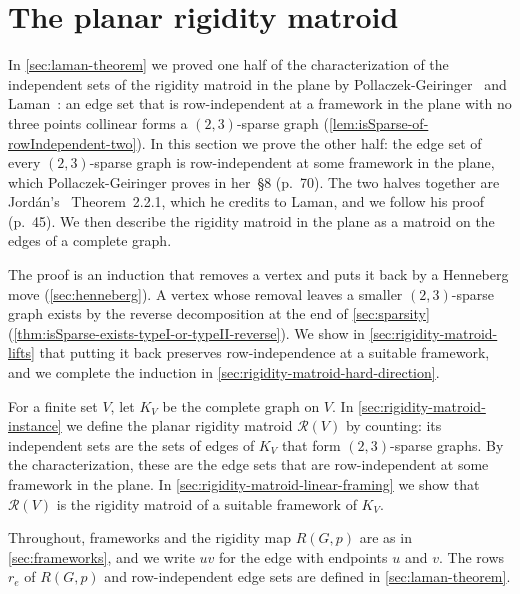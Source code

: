 \section{The planar rigidity matroid}
\label{sec:rigidity-matroid}

In \cref{sec:laman-theorem} we proved one half of the characterization
of the independent sets of the rigidity matroid in the plane by
Pollaczek-Geiringer~\cite{pollaczekGeiringer1927} and
Laman~\cite{laman1970}: an edge set that is row-independent
at a framework in the plane with no three points collinear forms a
$(2,3)$-sparse graph (\cref{lem:isSparse-of-rowIndependent-two}). In
this section we prove the other half: the edge set of every
$(2,3)$-sparse graph is row-independent at some framework in the
plane, which Pollaczek-Geiringer proves in her~\S8 (p.~70). The two
halves together are Jord\'an's~\cite{jordan2016}
Theorem~2.2.1, which he credits to Laman, and we follow his proof
(p.~45). We then describe the rigidity matroid in the plane as a
matroid on the edges of a complete graph.

The proof is an induction that removes a vertex and puts it back by a
Henneberg move (\cref{sec:henneberg}). A vertex whose removal leaves
a smaller $(2,3)$-sparse graph exists by the reverse decomposition at
the end of \cref{sec:sparsity}
(\cref{thm:isSparse-exists-typeI-or-typeII-reverse}). We show in
\cref{sec:rigidity-matroid-lifts} that putting it back preserves
row-independence at a suitable framework, and we complete the induction
in \cref{sec:rigidity-matroid-hard-direction}.

For a finite set $V$, let $K_V$ be the complete graph on $V$. In
\cref{sec:rigidity-matroid-instance} we define the planar rigidity
matroid $\mathcal{R}(V)$ by counting: its independent sets are the sets
of edges of $K_V$ that form $(2,3)$-sparse graphs. By the
characterization, these are the edge sets that are row-independent at
some framework in the plane. In
\cref{sec:rigidity-matroid-linear-framing} we show that
$\mathcal{R}(V)$ is the rigidity matroid of a suitable framework of
$K_V$.

Throughout, frameworks and the rigidity map $R(G, p)$ are as in
\cref{sec:frameworks}, and we write $uv$ for the edge with endpoints
$u$ and $v$. The rows $r_e$ of $R(G, p)$ and row-independent edge sets
are defined in \cref{sec:laman-theorem}.

